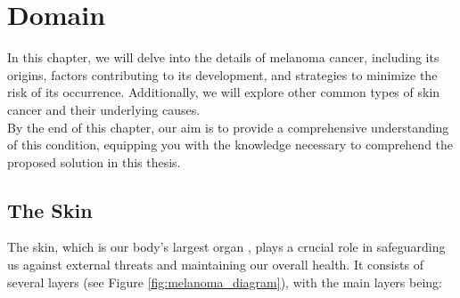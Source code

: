 \chapter{Domain} \label{cap:problem_domain}

In this chapter, we will delve into the details of melanoma cancer, including
its origins, factors contributing to its development, and strategies to
minimize the risk of its occurrence. Additionally, we will explore other common
types of skin cancer and their underlying causes. \\

By the end of this chapter, our aim is to provide a comprehensive understanding
of this condition, equipping you with the knowledge necessary to comprehend the
proposed solution in this thesis.

\section{The Skin}

The skin, which is our body's largest organ \cite{BaseCancerKnowledge}, plays a
crucial role in safeguarding us against external threats and maintaining our
overall health. It consists of several layers (see Figure
\ref{fig:melanoma_diagram}), with the main layers being:

